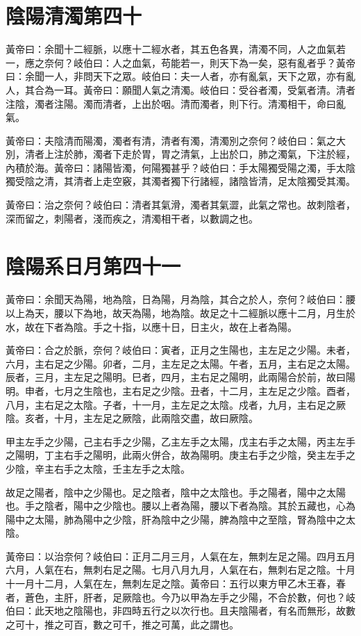 \section{陰陽清濁第四十}

黃帝曰：余聞十二經脈，以應十二經水者，其五色各異，清濁不同，人之血氣若一，應之奈何？岐伯曰：人之血氣，苟能若一，則天下為一矣，惡有亂者乎？黃帝曰：余聞一人，非問天下之眾。岐伯曰：夫一人者，亦有亂氣，天下之眾，亦有亂人，其合為一耳。黃帝曰：願聞人氣之清濁。岐伯曰：受谷者濁，受氣者清。清者注陰，濁者注陽。濁而清者，上出於咽。清而濁者，則下行。清濁相干，命曰亂氣。

黃帝曰：夫陰清而陽濁，濁者有清，清者有濁，清濁別之奈何？岐伯曰：氣之大別，清者上注於肺，濁者下走於胃，胃之清氣，上出於口，肺之濁氣，下注於經，內積於海。黃帝曰：諸陽皆濁，何陽獨甚乎？岐伯曰：手太陽獨受陽之濁，手太陰獨受陰之清，其清者上走空竅，其濁者獨下行諸經，諸陰皆清，足太陰獨受其濁。

黃帝曰：治之奈何？岐伯曰：清者其氣滑，濁者其氣澀，此氣之常也。故刺陰者，深而留之，刺陽者，淺而疾之，清濁相干者，以數調之也。

\section{陰陽系日月第四十一}

黃帝曰：余聞天為陽，地為陰，日為陽，月為陰，其合之於人，奈何？岐伯曰：腰以上為天，腰以下為地，故天為陽，地為陰。故足之十二經脈以應十二月，月生於水，故在下者為陰。手之十指，以應十日，日主火，故在上者為陽。

黃帝曰：合之於脈，奈何？岐伯曰：寅者，正月之生陽也，主左足之少陽。未者，六月，主右足之少陽。卯者，二月，主左足之太陽。午者，五月，主右足之太陽。辰者，三月，主左足之陽明。巳者，四月，主右足之陽明，此兩陽合於前，故曰陽明。申者，七月之生陰也，主右足之少陰。丑者，十二月，主左足之少陰。酉者，八月，主右足之太陰。子者，十一月，主左足之太陰。戍者，九月，主右足之厥陰。亥者，十月，主左足之厥陰，此兩陰交盡，故曰厥陰。

甲主左手之少陽，己主右手之少陽，乙主左手之太陽，戊主右手之太陽，丙主左手之陽明，丁主右手之陽明，此兩火併合，故為陽明。庚主右手之少陰，癸主左手之少陰，辛主右手之太陰，壬主左手之太陰。

故足之陽者，陰中之少陽也。足之陰者，陰中之太陰也。手之陽者，陽中之太陽也。手之陰者，陽中之少陰也。腰以上者為陽，腰以下者為陰。其於五藏也，心為陽中之太陽，肺為陽中之少陰，肝為陰中之少陽，脾為陰中之至陰，腎為陰中之太陰。

黃帝曰：以治奈何？岐伯曰：正月二月三月，人氣在左，無刺左足之陽。四月五月六月，人氣在右，無刺右足之陽。七月八月九月，人氣在右，無刺右足之陰。十月十一月十二月，人氣在左，無刺左足之陰。黃帝曰：五行以東方甲乙木王春，春者，蒼色，主肝，肝者，足厥陰也。今乃以甲為左手之少陽，不合於數，何也？岐伯曰：此天地之陰陽也，非四時五行之以次行也。且夫陰陽者，有名而無形，故數之可十，推之可百，數之可千，推之可萬，此之謂也。



